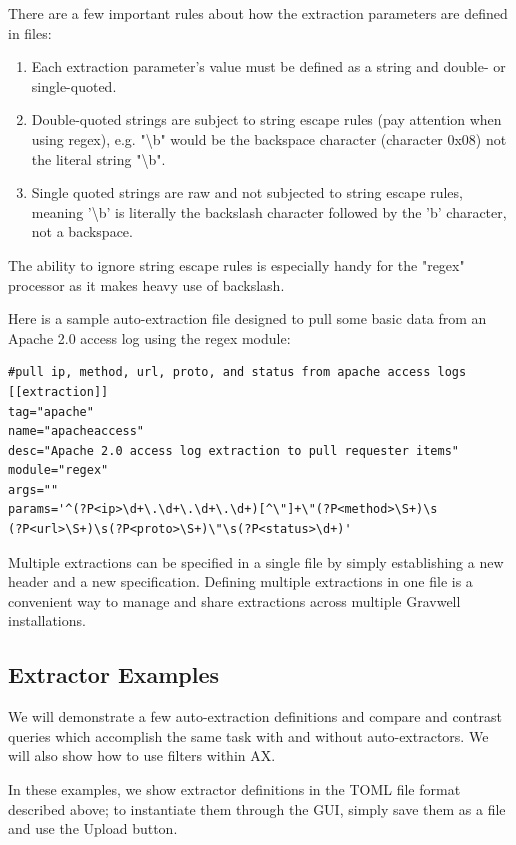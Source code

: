There are a few important rules about how the extraction parameters are
defined in files:

\begin{enumerate}
\tightlist
\item
  Each extraction parameter's value must be defined as a string and
  double- or single-quoted.
\item
  Double-quoted strings are subject to string escape rules (pay
  attention when using regex), e.g. "\textbackslash{}b" would be the backspace character (character 0x08)
  not the literal string "\textbackslash{}b".
\item
  Single quoted strings are raw and not subjected to string escape
  rules, meaning '\textbackslash{}b' is literally the backslash character followed
  by the 'b' character, not a backspace.
\end{enumerate}

The ability to ignore string escape rules is especially handy for the
"regex" processor as it makes heavy use of backslash.

Here is a sample auto-extraction file designed to pull some basic data
from an Apache 2.0 access log using the regex module:

\begin{Verbatim}[breaklines=true]
#pull ip, method, url, proto, and status from apache access logs
[[extraction]]
tag="apache"
name="apacheaccess"
desc="Apache 2.0 access log extraction to pull requester items"
module="regex"
args=""
params='^(?P<ip>\d+\.\d+\.\d+\.\d+)[^\"]+\"(?P<method>\S+)\s
(?P<url>\S+)\s(?P<proto>\S+)\"\s(?P<status>\d+)'
\end{Verbatim}

Multiple extractions can be specified in a single file by simply
establishing a new \code{[[extraction]]} header and a new
specification. Defining multiple extractions in one file is a convenient
way to manage and share extractions across multiple Gravwell installations.

\subsection{Extractor Examples}

We will demonstrate a few auto-extraction definitions and compare and
contrast queries which accomplish the same task with and without
auto-extractors. We will also show how to use filters within AX.

In these examples, we show extractor definitions in the TOML file format
described above; to instantiate them through the GUI, simply save them as a file and use the Upload button.

